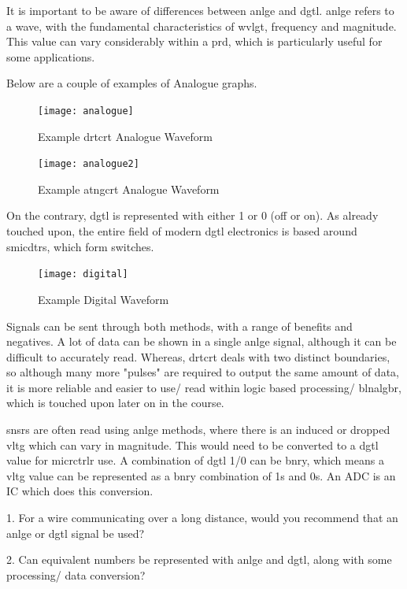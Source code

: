\documentclass[a4paper,11pt]{report}
\newcommand{\Quiz}[1] %
{
\par\noindent %
\phantomsection %
\todo[inline, color=blue!30]{\textbf{#1}} %
\vspace{1em} %
}
\begin{document}
It is important to be aware of differences between \gls{anlge} and \gls{dgtl}. \gls{anlge} refers to a wave, with the fundamental characteristics of \gls{wvlgt}, frequency and magnitude. This value can vary considerably within a \gls{prd}, which is particularly useful for some applications.

Below are a couple of examples of Analogue graphs.

\begin{figure}[H]
\centering
\texttt{[image: analogue]}
\caption{Example \gls{drtcrt} Analogue Waveform}
\end{figure}

\begin{figure}[H]
\centering
\texttt{[image: analogue2]}
\caption{Example \gls{atngcrt} Analogue Waveform}
\end{figure}

On the contrary, \gls{dgtl} is represented with either 1 or 0 (off or on). As already touched upon, the entire field of modern \gls{dgtl} electronics is based around \gls{smicdtr}s, which form switches.

\begin{figure}[H]
\centering
\texttt{[image: digital]}
\caption{Example Digital Waveform}
\end{figure}

Signals can be sent through both methods, with a range of benefits and negatives. A lot of data can be shown in a single \gls{anlge} signal, although it can be difficult to accurately read. Whereas, \gls{drtcrt} deals with two distinct boundaries, so although many more "pulses" are required to output the same amount of data, it is more reliable and easier to use/ read within logic based processing/ \gls{blnalgbr}, which is touched upon later on in the course.

\gls{snsr}s are often read using \gls{anlge} methods, where there is an induced or dropped \gls{vltg} which can vary in magnitude. This would need to be converted to a \gls{dgtl} value for \gls{micrctrlr} use. A combination of \gls{dgtl} 1/0 can be \gls{bnry}, which means a \gls{vltg} value can be represented as a \gls{bnry} combination of 1s and 0s. An ADC is an IC which does this conversion.

\Quiz{Quiz}

1. For a wire communicating over a long distance, would you recommend that an \gls{anlge} or \gls{dgtl} signal be used?

2. Can equivalent numbers be represented with \gls{anlge} and \gls{dgtl}, along with some processing/ data conversion?
\end{document}
